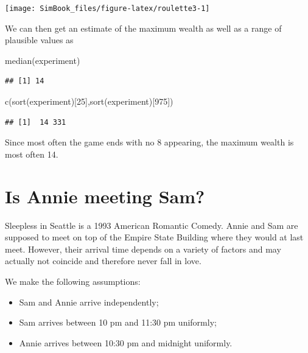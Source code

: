 \documentclass[
]{book}
\newenvironment{Shaded}{\begin{snugshade}}{\end{snugshade}}
\newcommand{\DecValTok}[1]{\textcolor[rgb]{0.00,0.00,0.81}{#1}}
\newcommand{\FunctionTok}[1]{\textcolor[rgb]{0.00,0.00,0.00}{#1}}
\newcommand{\NormalTok}[1]{#1}
\begin{document}
\begin{center}\texttt{[image: SimBook\_files/figure-latex/roulette3-1]} \end{center}

We can then get an estimate of the maximum wealth as well as a range of plausible values as

\begin{Shaded}
\begin{Highlighting}[]
\FunctionTok{median}\NormalTok{(experiment)}
\end{Highlighting}
\end{Shaded}

\begin{verbatim}
## [1] 14
\end{verbatim}

\begin{Shaded}
\begin{Highlighting}[]
\FunctionTok{c}\NormalTok{(}\FunctionTok{sort}\NormalTok{(experiment)[}\DecValTok{25}\NormalTok{],}\FunctionTok{sort}\NormalTok{(experiment)[}\DecValTok{975}\NormalTok{])}
\end{Highlighting}
\end{Shaded}

\begin{verbatim}
## [1]  14 331
\end{verbatim}

Since most often the game ends with no 8 appearing, the maximum wealth is most often 14.

\hypertarget{is-annie-meeting-sam}{%
\section{Is Annie meeting Sam?}\label{is-annie-meeting-sam}}

Sleepless in Seattle is a 1993 American Romantic Comedy. Annie and Sam are supposed to meet on top of the Empire State Building where they would at last meet. However, their arrival time depends on a variety of factors and may actually not coincide and therefore never fall in love.

We make the following assumptions:

\begin{itemize}
\item
  Sam and Annie arrive independently;
\item
  Sam arrives between 10 pm and 11:30 pm uniformly;
\item
  Annie arrives between 10:30 pm and midnight uniformly.
\end{itemize}
\end{document}
